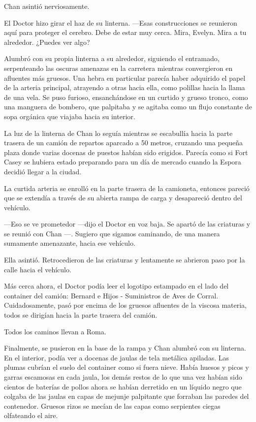 Chan asintió nerviosamente.

El Doctor hizo girar el haz de su linterna. ---Esas construcciones se
reunieron aquí para proteger el cerebro. Debe de estar muy cerca. Mira,
Evelyn. Mira a tu alrededor. ¿Puedes ver algo?

Alumbró con su propia linterna a su alrededor, siguiendo el entramado,
serpenteando las oscuras amenazas en la carretera mientras convergieron
en afluentes más gruesos. Una hebra en particular parecía haber
adquirido el papel de la arteria principal, atrayendo a otras hacia
ella, como polillas hacia la llama de una vela. Se puso furioso,
ensanchándose en un curtido y grueso tronco, como una manguera de
bombero, que palpitaba y se agitaba como un flujo constante de sopa
orgánica que viajaba hacia su interior.

La luz de la linterna de Chan lo seguía mientras se escabullía hacia la
parte trasera de un camión de repartos aparcado a 50 metros, cruzando
una pequeña plaza donde varias docenas de puestos habían sido erigidos.
Parecía como si Fort Casey se hubiera estado preparando para un día de
mercado cuando la Espora decidió llegar a la ciudad.

La curtida arteria se enrolló en la parte trasera de la camioneta,
entonces pareció que se extendía a través de su abierta rampa de carga y
desapareció dentro del vehículo.

---Eso se ve prometedor ---dijo el Doctor en voz baja. Se apartó de las
criaturas y se reunió con Chan ---. Sugiero que sigamos caminando, de
una manera sumamente amenazante, hacia ese vehículo.

Ella asintió. Retrocedieron de las criaturas y lentamente se abrieron
paso por la calle hacia el vehículo.

Más cerca ahora, el Doctor podía leer el logotipo estampado en el lado
del container del camión: Bernard e Hijos - Suministros de Aves de
Corral. Cuidadosamente, pasó por encima de los gruesos afluentes de la
viscosa materia, todos se dirigían hacia la parte trasera del camión.

Todos los caminos llevan a Roma.

Finalmente, se pusieron en la base de la rampa y Chan alumbró con su
linterna. En el interior, podía ver a docenas de jaulas de tela metálica
apiladas. Las plumas cubrían el suelo del container como si fuera nieve.
Había huesos y picos y garras escamosas en cada jaula, los demás restos
de lo que una vez habían sido cientos de baterías de pollos ahora se
habían derretido en un líquido negro que colgaba de las jaulas en capas
de mejunje palpitante que forraban las paredes del contenedor. Gruesos
rizos se mecían de las capas como serpientes ciegas olfateando el aire.

